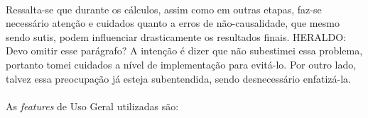 \paragraph{} Ressalta-se que durante os cálculos, assim como em outras etapas, faz-se necessário atenção e cuidados quanto a erros de não-causalidade, que mesmo sendo sutis, podem influenciar drasticamente os resultados finais. \color{red} HERALDO: Devo omitir esse parágrafo? A intenção é dizer que não subestimei essa problema, portanto tomei cuidados a nível de implementação para evitá-lo. Por outro lado, talvez essa preocupação já esteja subentendida, sendo desnecessário enfatizá-la. 

\paragraph{} As \textit{features} de Uso Geral utilizadas são:

